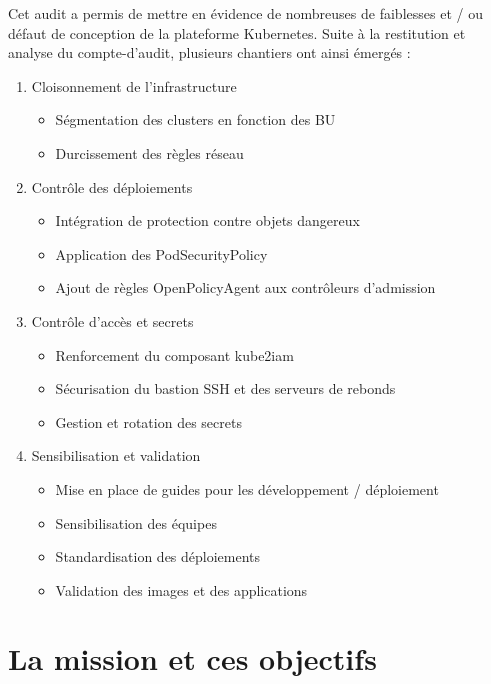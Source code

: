 Cet audit a permis de mettre en évidence de nombreuses de faiblesses et / ou défaut de conception de la plateforme Kubernetes. 
Suite à la restitution et analyse du compte-d'audit, plusieurs chantiers ont ainsi émergés :
\begin{enumerate}
    \item Cloisonnement de l'infrastructure
    \begin{itemize}
        \item Ségmentation des clusters en fonction des \ac{BU}
        \item Durcissement des règles réseau
    \end{itemize}
    \item Contrôle des déploiements
        \begin{itemize}
        \item Intégration de protection contre objets dangereux
        \item Application des PodSecurityPolicy
        \item Ajout de règles OpenPolicyAgent aux contrôleurs d'admission
    \end{itemize}
    \item Contrôle d'accès et secrets
    \begin{itemize}
        \item Renforcement du composant kube2iam
        \item Sécurisation du bastion SSH et des serveurs de rebonds
        \item Gestion et rotation des secrets
    \end{itemize}
    \item Sensibilisation et validation
    \begin{itemize}
        \item Mise en place de guides pour les développement / déploiement
        \item Sensibilisation des équipes
        \item Standardisation des déploiements
        \item Validation des images et des applications
    \end{itemize}
\end{enumerate}

\pagebreak

\section{La mission et ces objectifs}

